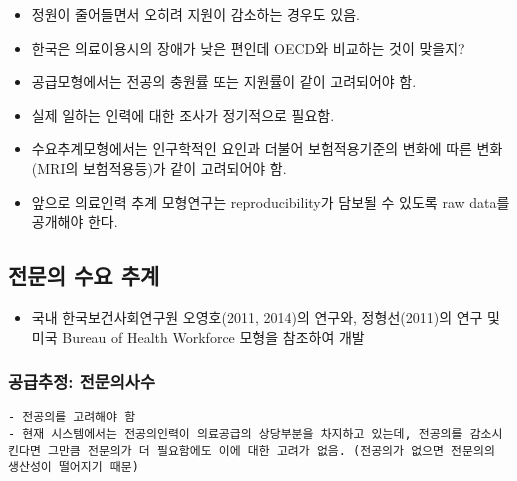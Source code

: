 \documentclass[]{book}
\providecommand{\tightlist}{%
  \setlength{\itemsep}{0pt}\setlength{\parskip}{0pt}}
\begin{document}
\begin{itemize}
  \begin{itemize}
  \item
    정원이 줄어들면서 오히려 지원이 감소하는 경우도 있음.
  \item
    한국은 의료이용시의 장애가 낮은 편인데 OECD와 비교하는 것이 맞을지?
  \item
    공급모형에서는 전공의 충원률 또는 지원률이 같이 고려되어야 함.
  \item
    실제 일하는 인력에 대한 조사가 정기적으로 필요함.
  \item
    수요추계모형에서는 인구학적인 요인과 더불어 보험적용기준의 변화에 따른 변화 (MRI의 보험적용등)가 같이 고려되어야 함.
  \item
    앞으로 의료인력 추계 모형연구는 reproducibility가 담보될 수 있도록 raw data를 공개해야 한다.
  \end{itemize}
\end{itemize}

\hypertarget{section-4}{%
\subsection{전문의 수요 추계}\label{section-4}}

\begin{itemize}
\tightlist
\item
  국내 한국보건사회연구원 오영호(2011, 2014)의 연구와, 정형선(2011)의 연구 및 미국 Bureau of Health Workforce 모형을 참조하여 개발
\end{itemize}

\hypertarget{section-5}{%
\subsubsection{공급추정: 전문의사수}\label{section-5}}

\begin{verbatim}
- 전공의를 고려해야 함
- 현재 시스템에서는 전공의인력이 의료공급의 상당부분을 차지하고 있는데, 전공의를 감소시킨다면 그만큼 전문의가 더 필요함에도 이에 대한 고려가 없음. (전공의가 없으면 전문의의 생산성이 떨어지기 때문)
\end{verbatim}
\end{document}
